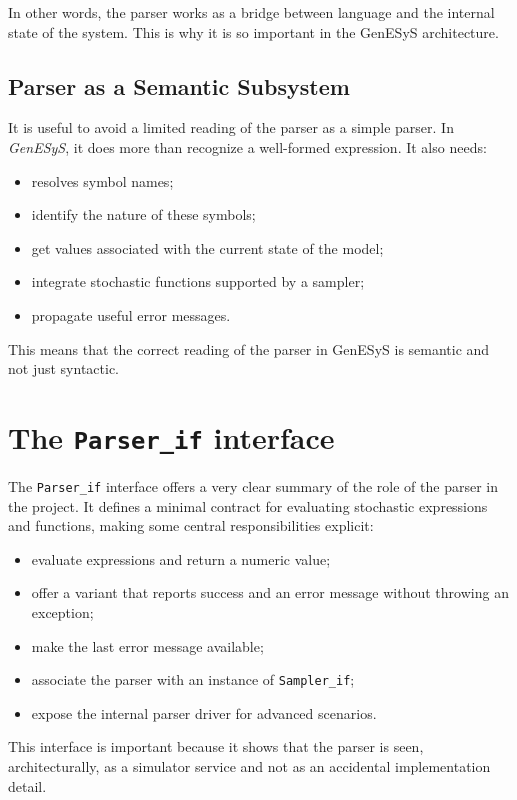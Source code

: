 In other words, the parser works as a bridge between language and the internal state of the system. This is why it is so important in the GenESyS architecture.

\subsection{Parser as a Semantic Subsystem}
\label{subsec:cap9_parser_como_subsistema_semantico}

It is useful to avoid a limited reading of the parser as a simple parser. In \textit{GenESyS}, it does more than recognize a well-formed expression. It also needs:
\begin{itemize}
 \item resolves symbol names;
 \item identify the nature of these symbols;
 \item get values associated with the current state of the model;
 \item integrate stochastic functions supported by a sampler;
 \item propagate useful error messages.
\end{itemize}

This means that the correct reading of the parser in GenESyS is semantic and not just syntactic.

\section{The \texttt{Parser\_if} interface}
\label{sec:cap9_interface_parser_if}

The \texttt{Parser\_if} interface offers a very clear summary of the role of the parser in the project. It defines a minimal contract for evaluating stochastic expressions and functions, making some central responsibilities explicit:
\begin{itemize}
 \item evaluate expressions and return a numeric value;
 \item offer a variant that reports success and an error message without throwing an exception;
 \item make the last error message available;
 \item associate the parser with an instance of \texttt{Sampler\_if};
 \item expose the internal parser driver for advanced scenarios.
\end{itemize}

This interface is important because it shows that the parser is seen, architecturally, as a simulator service and not as an accidental implementation detail.

